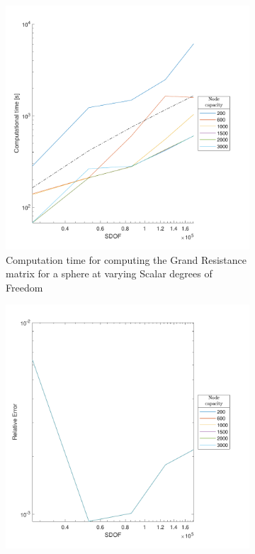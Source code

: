 \begin{figure}[ht]
     \centering
     \begin{subfigure}[b]{0.49\textwidth}
         \centering
         \includegraphics[width=\textwidth]{Images/KIFMM/Graphs/NodeCapTime.pdf}
         \caption{Computation time for computing the Grand Resistance matrix for a sphere at varying Scalar degrees of Freedom}
         \label{fig:NodeCapTime}
     \end{subfigure}
     \hfill
     \begin{subfigure}[b]{0.49\textwidth}
         \centering
         \includegraphics[width=\textwidth]{Images/KIFMM/Graphs/NodeCapError.pdf}

\end{subfigure}
\end{figure}
